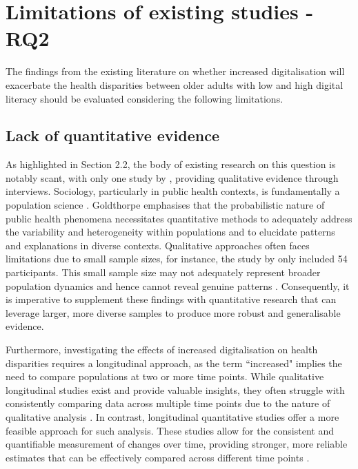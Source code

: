 \section{Limitations of existing studies - RQ2}
The findings from the existing literature on whether increased digitalisation will exacerbate the health disparities between older adults with low and high digital literacy should be evaluated considering the following limitations. 

\subsection{Lack of quantitative evidence}
As highlighted in Section 2.2, the body of existing research on this question is notably scant, with only one study by \textcite{alkureishi_digitally_2021}, providing qualitative evidence through interviews. Sociology, particularly in public health contexts, is fundamentally a population science \parencite[p. 31]{goldthorpe_sociology_2016}. Goldthorpe emphasises that the probabilistic nature of public health phenomena necessitates quantitative methods to adequately address the variability and heterogeneity within populations and to elucidate patterns and explanations in diverse contexts. Qualitative approaches often faces limitations due to small sample sizes, for instance, the study by \textcite{alkureishi_digitally_2021} only included 54 participants. This small sample size may not adequately represent broader population dynamics and hence cannot reveal genuine patterns \parencite{trafimow_considering_2014}. Consequently, it is imperative to supplement these findings with quantitative research that can leverage larger, more diverse samples to produce more robust and generalisable evidence.

Furthermore, investigating the effects of increased digitalisation on health disparities requires a longitudinal approach, as the term ``increased" implies the need to compare populations at two or more time points. While qualitative longitudinal studies exist and provide valuable insights, they often struggle with consistently comparing data across multiple time points due to the nature of qualitative analysis \parencite{hermanowicz_longitudinal_2013}. In contrast, longitudinal quantitative studies offer a more feasible approach for such analysis. These studies allow for the consistent and quantifiable measurement of changes over time, providing stronger, more reliable estimates that can be effectively compared across different time points \parencite{trafimow_considering_2014}. 

